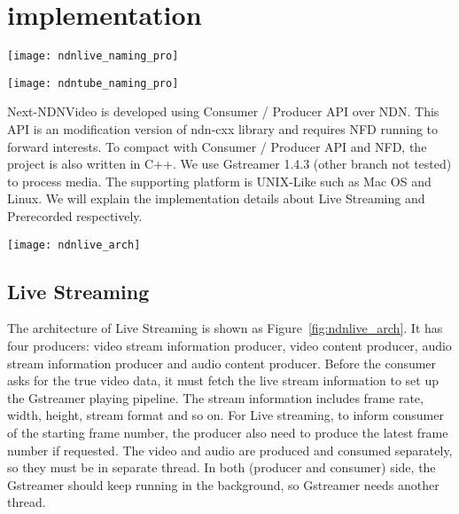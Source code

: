 \section{implementation} %
\label{sec:implementation}
\begin{figure*}%
  \centering
  \texttt{[image: ndnlive\_naming\_pro]}
  \caption{NDNLive Producer and Consumer Structure}
  \label{fig:ndnlive_cp}
\end{figure*}

\begin{figure*}%
  \centering
  \texttt{[image: ndntube\_naming\_pro]}
  \caption{NDNTube Producer and Consumer Structure}
  \label{fig:ndntube_cp}
\end{figure*}

Next-NDNVideo is developed using Consumer / Producer API over NDN. This API is an modification version of ndn-cxx library and requires NFD running to forward interests. To compact with Consumer / Producer API and NFD, the project is also written in C++. We use Gstreamer 1.4.3 (other branch not tested) to process media. The supporting platform is UNIX-Like such as Mac OS and Linux. We will explain the implementation details about Live Streaming and Prerecorded respectively.
\begin{figure*}[htbp]
  \centering
  \texttt{[image: ndnlive\_arch]}
  \caption{NDNLive Architecture}
  \label{fig:ndnlive_arch}
\end{figure*}

\subsection{Live Streaming}
The architecture of Live Streaming is shown as Figure~\ref{fig:ndnlive_arch}. It has four producers: video stream information producer, video content producer, audio stream information producer and audio content producer. Before the consumer asks for the true video data, it must fetch the live stream information to set up the Gstreamer playing pipeline. The stream information includes frame rate, width, height, stream format and so on. For Live streaming, to inform consumer of the starting frame number, the producer also need to produce the latest frame number if requested. The video and audio are produced and consumed separately, so they must be in separate thread. In both (producer and consumer) side, the Gstreamer should keep running in the background, so Gstreamer needs another thread. 

